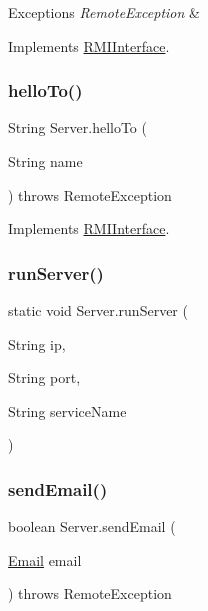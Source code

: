 \begin{DoxyExceptions}{Exceptions}
{\em Remote\+Exception} & \\
\hline
\end{DoxyExceptions}


Implements \hyperlink{interface_r_m_i_interface_ad326010c8c132dd3398a4443cf827601}{R\+M\+I\+Interface}.

\mbox{\label{class_server_a5bb8a4d74a82c7e2590de523648fa3ab}} 
\subsubsection{\texorpdfstring{hello\+To()}{helloTo()}}
{\footnotesize\ttfamily String Server.\+hello\+To (\begin{DoxyParamCaption}\item[{String}]{name }\end{DoxyParamCaption}) throws Remote\+Exception}



Implements \hyperlink{interface_r_m_i_interface_a44a3680b28462fce581d362dbc6cf1db}{R\+M\+I\+Interface}.

\mbox{\label{class_server_af25f1267d05a10696368d856a11328e1}} 
\subsubsection{\texorpdfstring{run\+Server()}{runServer()}}
{\footnotesize\ttfamily static void Server.\+run\+Server (\begin{DoxyParamCaption}\item[{String}]{ip,  }\item[{String}]{port,  }\item[{String}]{service\+Name }\end{DoxyParamCaption})\hspace{0.3cm}{\ttfamily [static]}}

\mbox{\label{class_server_a4c26769f2867086519a196bc92502af6}} 
\subsubsection{\texorpdfstring{send\+Email()}{sendEmail()}}
{\footnotesize\ttfamily boolean Server.\+send\+Email (\begin{DoxyParamCaption}\item[{\hyperlink{class_email}{Email}}]{email }\end{DoxyParamCaption}) throws Remote\+Exception}

